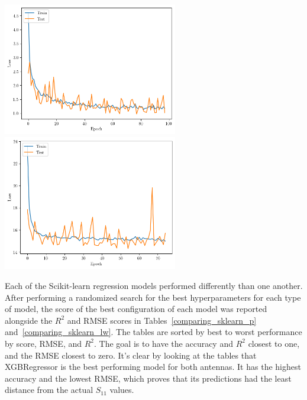 \documentclass[conference]{IEEEtran}
\newenvironment{Figure}
    {\par\medskip\noindent\minipage{\linewidth}}
    {\endminipage\par\medskip}
\begin{document}
\begin{Figure}
    \centering
    \includegraphics[width=3in]{loss}
    \includegraphics[width=3in]{loss_lw}
    \label{dnn_loss_graph}
\end{Figure}

Each of the Scikit-learn regression models performed differently than one another. After performing a randomized search for the best hyperparameters for each type of model, the score of the best configuration of each model was reported alongside the $R^2$ and RMSE scores in Tables~\ref{comparing_sklearn_p} and~\ref{comparing_sklearn_lw}. The tables are sorted by best to worst performance by score, RMSE, and $R^2$. The goal is to have the accuracy and $R^2$ closest to one, and the RMSE closest to zero. It's clear by looking at the tables that XGBRegressor is the best performing model for both antennas. It has the highest accuracy and the lowest RMSE, which proves that its predictions had the least distance from the actual $S_{11}$ values. 
\end{document}
